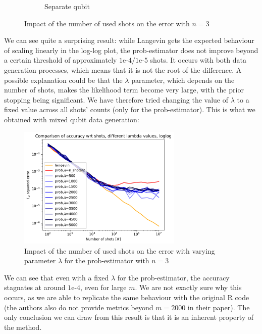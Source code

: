 \documentclass[12pt]{memoir}
\begin{document}
\begin{figure}[H]
\begin{subfigure}[b]{0.49\textwidth}
        \caption{Separate qubit}

        \label{fig:shots-comp-sep-sub}

    \end{subfigure}

    \caption{Impact of the number of used shots on the error with $n=3$}

    \label{fig:shots-comp}

\end{figure}

We can see quite a surprising result: while Langevin gets the expected behaviour of scaling linearly in the log-log plot, the prob-estimator does not improve beyond a certain threshold of approximately $1\text{e-}4/1\text{e-}5$ shots. It occurs with both data generation processes, which means that it is not the root of the difference. A possible explanation could be that the $\lambda$ parameter, which depends on the number of shots, makes the likelihood term become very large, with the prior stopping being significant. We have therefore tried changing the value of $\lambda$ to a fixed value across all shots' counts (only for the prob-estimator). This is what we obtained with mixed qubit data generation:


\begin{figure}[H]
    \centering
    \includegraphics[width=0.7\textwidth]{figures/experiments/shots/shots_acc_comp_shots_exp_lambda_prob_with_var_lambda_loglog-1.png}
    \caption{Impact of the number of used shots on the error with varying parameter $\lambda$ for the prob-estimator with $n=3$}
    \label{fig:shots-comp-prob-var-lambda}
\end{figure}


We can see that even with a fixed $\lambda$ for the prob-estimator, the accuracy stagnates at around $1\text{e-}4$, even for large $m$. We are not exactly sure why this occurs, as we are able to replicate the same behaviour with the original R code (the authors also do not provide metrics beyond $m=2000$ in their paper). The only conclusion we can draw from this result is that it is an inherent property of the method.
\end{document}
